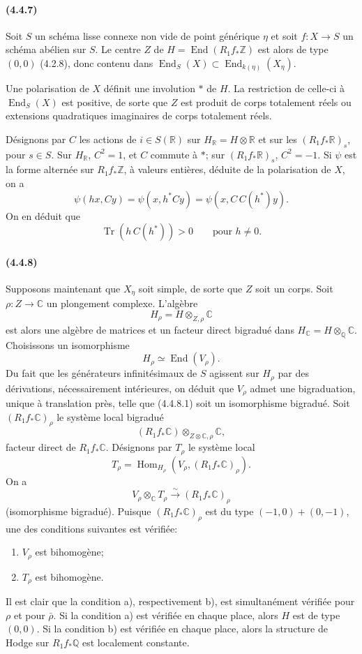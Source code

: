 \documentclass[10pt]{article}
\newcommand{\C}{\mathbb C}
\newcommand{\Q}{\mathbb Q}
\newcommand{\Z}{\mathbb Z}
\newcommand{\Hom}{\operatorname{Hom}}
\newcommand{\iso}{\xrightarrow{\sim}}
\newcommand{\R}{\mathbb R}
\providecommand{\End}{\operatorname{End}}
\newcommand{\Tr}{\operatorname{Tr}}
\begin{document}
\paragraph{(4.4.7)} Soit $S$ un schéma lisse connexe non vide de point générique $\eta$ et soit $f:X\to S$ un schéma abélien sur $S$. Le centre $Z$ de $H=\End(R_1f_*\Z)$ est alors de type $(0,0)$ (4.2.8), donc contenu dans $\End_S(X)\subset \End_{k(\eta)}(X_\eta)$.

Une polarisation de $X$ définit une involution $*$ de $H$. La restriction de celle-ci à $\End_S(X)$ est positive, de sorte que $Z$ est produit de corps totalement réels ou extensions quadratiques imaginaires de corps totalement réels.

Désignons par $C$ les actions de $i\in S(\R)$ sur $H_\R=H\otimes\R$ et sur les $(R_1f_*\R)_s$, pour $s\in S$. Sur $H_\R$, $C^2=1$, et $C$ commute à $*$; sur $(R_1f_*\R)_s$, $C^2=-1$. Si $\psi$ est la forme alternée sur $R_1f_*\Z$, à valeurs entières, déduite de la polarisation de $X$, on a
\[
\psi(hx,Cy)=\psi(x,h^*Cy)=\psi(x,C\,C(h^*)y).
\]
On en déduit que
\[
\tag{4.4.7.1}
\Tr(h\,C(h^*))>0\qquad\text{pour }h\ne0.
\]

\paragraph{(4.4.8)} Supposons maintenant que $X_\eta$ soit simple, de sorte que $Z$ soit un corps. Soit $\rho:Z\to\C$ un plongement complexe. L'algèbre
\[
H_\rho=H\otimes_{Z,\rho}\C
\]
est alors une algèbre de matrices et un facteur direct bigradué dans $H_\C=H\otimes_\Q\C$. Choisissons un isomorphisme
\[
\tag{4.4.8.1}
H_\rho\simeq\End(V_\rho).
\]
Du fait que les générateurs infinitésimaux de $S$ agissent sur $H_\rho$ par des dérivations, nécessairement intérieures, on déduit que $V_\rho$ admet une bigraduation, unique à translation près, telle que (4.4.8.1) soit un isomorphisme bigradué. Soit $(R_1f_*\C)_\rho$ le système local bigradué
\[
(R_1f_*\C)\otimes_{Z\otimes\C,\rho}\C,
\]
facteur direct de $R_1f_*\C$. Désignons par $T_\rho$ le système local
\[
T_\rho=\Hom_{H_\rho}(V_\rho,(R_1f_*\C)_\rho).
\]
On a
\[
\tag{4.4.8.2}
V_\rho\otimes_\C T_\rho\iso (R_1f_*\C)_\rho
\]
(isomorphisme bigradué). Puisque $(R_1f_*\C)_\rho$ est du type $(-1,0)+(0,-1)$, une des conditions suivantes est vérifiée:
\begin{enumerate}[label=\alph*)]
\item $V_\rho$ est bihomogène;
\item $T_\rho$ est bihomogène.
\end{enumerate}
Il est clair que la condition a), respectivement b), est simultanément vérifiée pour $\rho$ et pour $\bar\rho$. Si la condition a) est vérifiée en chaque place, alors $H$ est de type $(0,0)$. Si la condition b) est vérifiée en chaque place, alors la structure de Hodge sur $R_1f_*\Q$ est localement constante.
\end{document}
